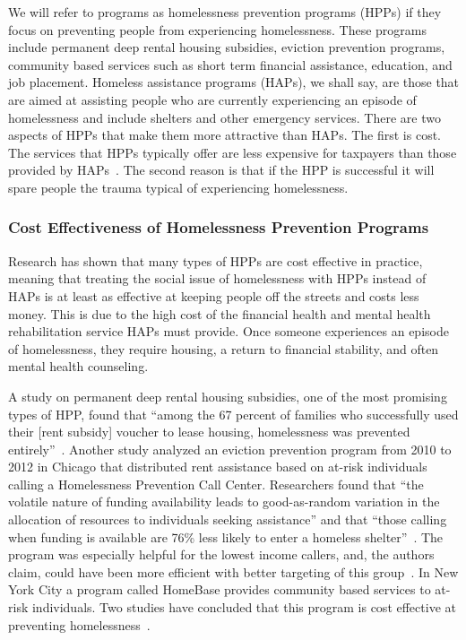 \documentclass[10pt,letterpaper]{article}
\newcommand{\red}[1]{{\color{red}{#1}}}
\begin{document}
We will refer to programs as homelessness prevention programs (HPPs) if they focus on preventing people from experiencing homelessness. These programs include permanent deep rental housing subsidies, eviction prevention programs, community based services such as short term financial assistance, education, and job placement. Homeless assistance programs (HAPs), we shall say, are those that are aimed at assisting people who are currently experiencing an episode of homelessness and include shelters and other emergency services. There are two aspects of HPPs that make them more attractive than HAPs. The first is cost. The services that HPPs typically offer are less expensive for taxpayers than those provided by HAPs~\cite{shinn2019homelessness}. The second reason is that if the HPP is successful it will spare people the trauma typical of experiencing homelessness.

\subsubsection*{Cost Effectiveness of Homelessness Prevention Programs}
Research has shown that many types of HPPs are cost effective in practice, meaning that treating the social issue of homelessness with HPPs instead of HAPs is at least as effective at keeping people off the streets and costs less money. This is due to the high cost of the financial health and mental health rehabilitation service HAPs must provide. Once someone experiences an episode of homelessness, they require housing, a return to financial stability, and often mental health counseling. \red{add source}

A study on permanent deep rental housing subsidies, one of the most promising types of HPP, found that ``among the 67 percent of families who successfully used their [rent subsidy] voucher to lease housing, homelessness was prevented entirely''~\cite{shinn2019homelessness}. Another study analyzed an eviction prevention program from 2010 to 2012 in Chicago that distributed rent assistance based on at-risk individuals calling a Homelessness Prevention Call Center. Researchers found that ``the volatile nature of funding availability leads to good-as-random variation in the allocation of resources to individuals seeking assistance'' and that ``those calling when funding is available are 76\% less likely to enter a homeless shelter''~\cite{evans2016impact}. The program was especially helpful for the lowest income callers, and, the authors claim, could have been more efficient with better targeting of this group~\cite{evans2016impact}. In New York City a program called HomeBase provides community based services to at-risk individuals. Two studies have concluded that this program is cost effective at preventing homelessness~\cite{rolston2013evaluation, goodman2016homelessness}. 
\end{document}
